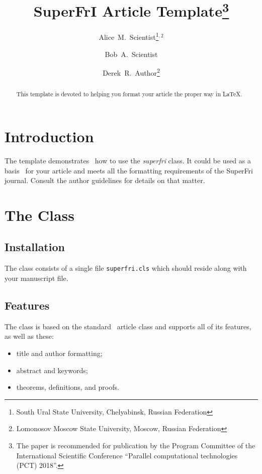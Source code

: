 \documentclass{superfri}
\begin{document}
\author{Alice~M.~Scientist\footnote{\label{susu}South Ural State University, Chelyabinsk, Russian Federation}$^{,2}$ \and  Bob~A.~Scientist \and Derek~R.~Author\footnote{\label{msu}Lomonosov Moscow State University, Moscow, Russian Federation}
}

\title{SuperFrI Article Template\thanks{The paper is recommended for publication by the Program Committee of the International Scientific Conference ``Parallel computational technologies (PCT) 2018''.}}

\maketitle{}

\begin{abstract}%
This template is devoted to helping you format your article the proper way in
\LaTeX.

\end{abstract}

\section*{Introduction}
\label{sec:intro}
The template demonstrates~\cite{DBLP:conf/ics/2015} how to use the \emph{superfri} class. It could be
used as a basis~\cite{DBLP:conf/iccS/AltintasNLKDS16} for your article and meets all the formatting requirements of
the SuperFri journal. Consult the author
guidelines for details on that matter.

\section{The Class}
\label{sec:class}

\subsection{Installation}
\label{sec:install}
The class consists of a single file \verb=superfri.cls= which should reside
along with your manuscript file.

\subsection{Features}
\label{sec:features}
The class is based on the standard~\cite{DBLP:books/sp/byeon2010/RiedelSMWL10} article class and supports all of its
features, as well as these:
\begin{itemize}
\item title and author formatting;
\item abstract and keywords;
\item theorems, definitions, and proofs.
\end{itemize}
\end{document}
